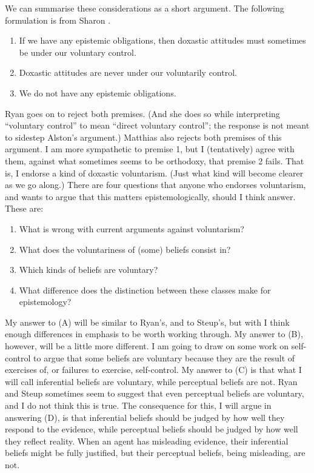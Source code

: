 We can summarise these considerations as a short argument. The following formulation is from Sharon \cite[49]{Ryan2003}.

\begin{enumerate}
\item If we have any epistemic obligations, then doxastic attitudes must sometimes be under our voluntary control.
\item Doxastic attitudes are never under our voluntarily control.
\item We do not have any epistemic obligations.
\end{enumerate}

\noindent Ryan goes on to reject both premises. (And she does so while interpreting ``voluntary control'' to mean ``direct voluntary control''; the response is not meant to sidestep Alston's argument.) Matthias \citet{Steup2000, Steup2008} also rejects both premises of this argument. I am more sympathetic to premise 1, but I (tentatively) agree with them, against what sometimes seems to be orthodoxy, that premise 2 fails. That is, I endorse a kind of doxastic voluntarism. (Just what kind will become clearer as we go along.) There are four questions that anyone who endorses voluntarism, and wants to argue that this matters epistemologically, should I think answer. These are:

\begin{enumerate}
\renewcommand{\labelenumi}{(\Alph{enumi})}
\item What is wrong with current arguments against voluntarism?
\item What does the voluntariness of (some) beliefs consist in?
\item Which kinds of beliefs are voluntary?
\item What difference does the distinction between these classes make for epistemology?
\end{enumerate}

\noindent My answer to (A) will be similar to Ryan's, and to Steup's, but with I think enough differences in emphasis to be worth working through. My answer to (B), however, will be a little more different. I am going to draw on some work on self-control to argue that some beliefs are voluntary because they are the result of exercises of, or failures to exercise, self-control. My answer to (C) is that what I will call inferential beliefs are voluntary, while perceptual beliefs are not. Ryan and Steup sometimes seem to suggest that even perceptual beliefs are voluntary, and I do not think this is true. The consequence for this, I will argue in answering (D), is that inferential beliefs should be judged by how well they respond to the evidence, while perceptual beliefs should be judged by how well they reflect reality. When an agent has misleading evidence, their inferential beliefs might be fully justified, but their perceptual beliefs, being misleading, are not.

